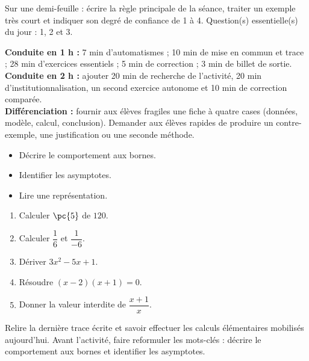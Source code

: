 \begin{exitticket}[3 minutes]Sur une demi-feuille : écrire la règle principale de la séance, traiter un exemple très court et indiquer son degré de confiance de 1 à 4. Question(s) essentielle(s) du jour : 1, 2 et 3.\end{exitticket}

\ifmxteacher
\begin{method}
\textbf{Conduite en 1 h :} 7 min d'automatismes ; 10 min de mise en commun et trace ; 28 min d'exercices essentiels ; 5 min de correction ; 3 min de billet de sortie.\\
\textbf{Conduite en 2 h :} ajouter 20 min de recherche de l'activité, 20 min d'institutionnalisation, un second exercice autonome et 10 min de correction comparée.\\
\textbf{Différenciation :} fournir aux élèves fragiles une fiche à quatre cases (données, modèle, calcul, conclusion). Demander aux élèves rapides de produire un contre-exemple, une justification ou une seconde méthode.
\end{method}
\fi
{}
\begin{objectives}\begin{itemize}\item Décrire le comportement aux bornes.\item Identifier les asymptotes.\item Lire une représentation.\end{itemize}\end{objectives}
\begin{fluency}\begin{enumerate}\item Calculer $\pc{5}$ de $120$. \item Calculer $\dfrac1{6}$ et $\dfrac1{-6}$. \item Dériver $3x^2-5x+1$. \item Résoudre $(x-2)(x+1)=0$. \item Donner la valeur interdite de $\dfrac{x+1}{x}$. \end{enumerate}\end{fluency}
\begin{prerequisites}Relire la dernière trace écrite et savoir effectuer les calculs élémentaires mobilisés aujourd'hui. Avant l'activité, faire reformuler les mots-clés : décrire le comportement aux bornes et identifier les asymptotes.\end{prerequisites}

